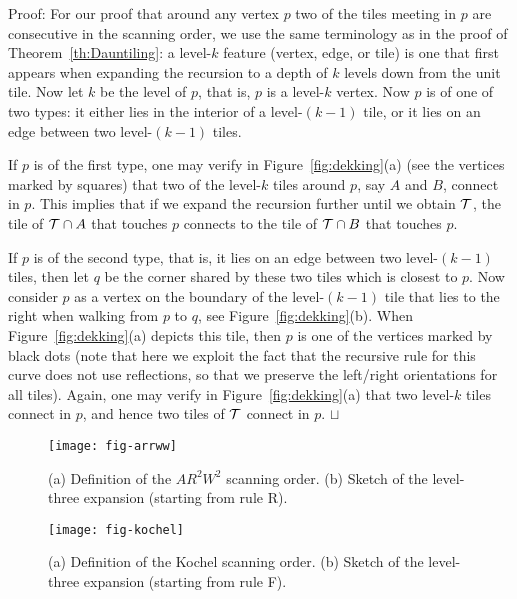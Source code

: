 \documentclass[11pt,a4paper]{article}
\newcommand{\ARRWW}{$AR^2W^2$\xspace}
\newenvironment{proof}{Proof:}{\qed}
\def\squareforqed{\hbox{\rlap{$\sqcap$}$\sqcup$}}
\def\qed{\ifmmode\squareforqed\else{\unskip\nobreak\hfil
\penalty50\hskip1em\null\nobreak\hfil\squareforqed
\parfillskip=0pt\finalhyphendemerits=0\endgraf}\fi}
\begin{document}
\begin{proof}
For our proof that around any vertex $p$ two of the tiles meeting in $p$ are consecutive in the scanning order, we use the same terminology as in the proof of Theorem~\ref{th:Dauntiling}: a level-$k$ feature (vertex, edge, or tile) is one that first appears when expanding the recursion to a depth of $k$ levels down from the unit tile. Now let $k$ be the level of $p$, that is, $p$ is a level-$k$ vertex. Now $p$ is of one of two types: it either lies in the interior of a level-$(k-1)$ tile, or it lies on an edge between two level-$(k-1)$ tiles.

If $p$ is of the first type, one may verify in Figure~\ref{fig:dekking}(a) (see the vertices marked by squares) that two of the level-$k$ tiles around $p$, say $A$ and $B$, connect in $p$. This implies that if we expand the recursion further until we obtain ${\cal T}$, the tile of ${\cal T} \cap A$ that touches $p$ connects to the tile of ${\cal T} \cap B$ that touches $p$.

If $p$ is of the second type, that is, it lies on an edge between two level-$(k-1)$ tiles, then let $q$ be the corner shared by these two tiles which is closest to $p$. Now consider $p$ as a vertex on the boundary of the level-$(k-1)$ tile that lies to the right when walking from $p$ to $q$, see Figure~\ref{fig:dekking}(b). When Figure~\ref{fig:dekking}(a) depicts this tile, then $p$ is one of the vertices marked by black dots (note that here we exploit the fact that the recursive rule for this curve does not use reflections, so that we preserve the left/right orientations for all tiles). Again, one may verify in Figure~\ref{fig:dekking}(a) that two level-$k$ tiles connect in $p$, and hence two tiles of ${\cal T}$ connect in $p$.
\end{proof}

\begin{figure}
\centering
\texttt{[image: fig-arrww]}
\caption{(a) Definition of the \ARRWW scanning order. (b) Sketch of the level-three expansion (starting from rule \textsf{R}).}
\label{fig:arrww}
\end{figure}

\begin{figure}
\centering
\texttt{[image: fig-kochel]}
\caption{(a) Definition of the Kochel scanning order. (b) Sketch of the level-three expansion (starting from rule \textsf{F}).}
\label{fig:kochel}
\end{figure}
\end{document}

